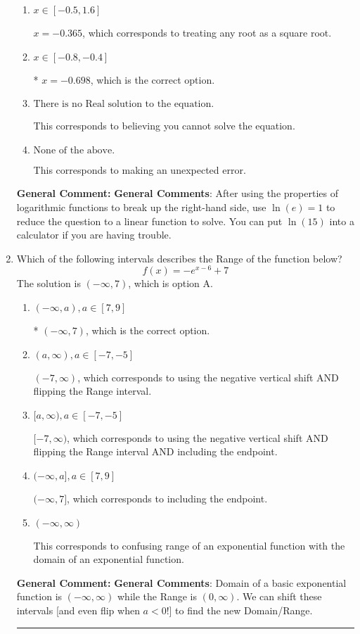 \documentclass{extbook}[14pt]
\newcommand{\litem}[1]{\item #1

\rule{\textwidth}{0.4pt}}
\begin{document}
\begin{enumerate}
{\begin{enumerate}[label=\Alph*.]
$x = -6.968$, which corresponds to thinking you don't need to take the natural log of both sides before reducing, as if the equation already had a natural log on the right side.
\item \( x \in [-0.5, 1.6] \)

$x = -0.365$, which corresponds to treating any root as a square root.
\item \( x \in [-0.8, -0.4] \)

* $x = -0.698$, which is the correct option.
\item \( \text{There is no Real solution to the equation.} \)

This corresponds to believing you cannot solve the equation.
\item \( \text{None of the above.} \)

This corresponds to making an unexpected error.
\end{enumerate}

\textbf{General Comment:} \textbf{General Comments}: After using the properties of logarithmic functions to break up the right-hand side, use $\ln(e) = 1$ to reduce the question to a linear function to solve. You can put $\ln(15)$ into a calculator if you are having trouble.
}
\litem{
Which of the following intervals describes the Range of the function below?
\[ f(x) = -e^{x-6}+7 \]The solution is \( (-\infty, 7) \), which is option A.\begin{enumerate}[label=\Alph*.]
\item \( (-\infty, a), a \in [7, 9] \)

* $(-\infty, 7)$, which is the correct option.
\item \( (a, \infty), a \in [-7, -5] \)

$(-7, \infty)$, which corresponds to using the negative vertical shift AND flipping the Range interval.
\item \( [a, \infty), a \in [-7, -5] \)

$[-7, \infty)$, which corresponds to using the negative vertical shift AND flipping the Range interval AND including the endpoint.
\item \( (-\infty, a], a \in [7, 9] \)

$(-\infty, 7]$, which corresponds to including the endpoint.
\item \( (-\infty, \infty) \)

This corresponds to confusing range of an exponential function with the domain of an exponential function.
\end{enumerate}

\textbf{General Comment:} \textbf{General Comments}: Domain of a basic exponential function is $(-\infty, \infty)$ while the Range is $(0, \infty)$. We can shift these intervals [and even flip when $a<0$!] to find the new Domain/Range.
}
\end{enumerate}
\end{document}
